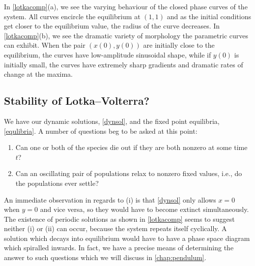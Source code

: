 \documentclass[main.tex]{subfiles}
\begin{document}
In \cref{lotkacomp}(a), we see the varying behaviour of the closed phase curves of the system. All curves encircle the equilibrium at $(1,1)$ and as the initial conditions get closer to the equilibrium value, the radius of the curve decreases. In \cref{lotkacomp}(b), we see the dramatic variety of morphology the parametric curves can exhibit. When the pair $(x(0),y(0))$  are initially close to the equilibrium, the curves have low-amplitude sinusoidal shape, while if $y(0)$ is initially small, the curves have extremely sharp gradients and dramatic rates of change at the maxima. 

\subsection{Stability of Lotka--Volterra?}
We have our dynamic solutions, \cref{dynsol}, and the fixed point equilibria, \cref{equlibria}. A number of questions beg to be asked at this point:
\begin{enumerate}[label=(\roman*)]
\item Can one or both of the species die out if they are both nonzero at some time $t$? 
\item Can an oscillating pair of populations relax to nonzero fixed values, i.e., do the populations ever settle? 
\end{enumerate}
An immediate observation in regards to (i) is that \cref{dynsol} only allows $x=0$ when $y=0$ and vice versa, so they would have to become extinct simultaneously. The existence of periodic solutions as shown in \cref{lotkacomp} seems to suggest neither (i) or (ii) can occur, because the system repeats itself cyclically. A solution which decays into equilibrium would have to have a phase space diagram which spiralled inwards. In fact, we have a precise means of determining the answer to such questions which we will discuss in \cref{chap:pendulum}.
\end{document}
